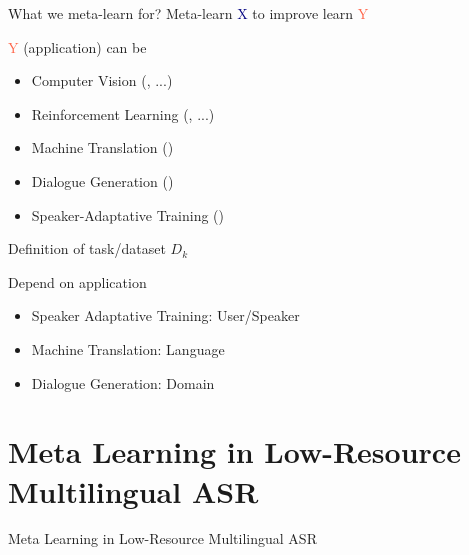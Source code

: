 \documentclass{beamer}
\begin{document}
\begin{frame}[t]{What we meta-learn for?}
  \centering Meta-learn \textcolor{navy}{X} to improve learn \textcolor{tomato}{Y}

  \flushleft \textcolor{tomato}{Y} (application) can be
  \begin{itemize}
    \item Computer Vision (\citealt{snell2017prototypical}, \citealt{rusu2018meta} ...)
    \item Reinforcement Learning (\citealt{eysenbach2018diversity}, \citealt{xu2018meta} ...)
    \item Machine Translation (\citealt{gu2018meta})
    \item Dialogue Generation (\citealt{mi2019meta})
    \item Speaker-Adaptative Training (\citealt{klejch2019speaker})
  \end{itemize}

\end{frame}

\begin{frame}[t]{Definition of task/dataset $D_k$}
  \begin{center}
    \LARGE{Depend on application}
  \end{center}
    \begin{itemize}
      \item Speaker Adaptative Training: User/Speaker
      \item Machine Translation: Language
      \item Dialogue Generation: Domain
    \end{itemize}
\end{frame}

\section{Meta Learning in Low-Resource Multilingual ASR}

\begin{frame}
	\begin{center}
    \LARGE{Meta Learning in Low-Resource Multilingual ASR}
	\end{center}
\end{frame}
\end{document}
